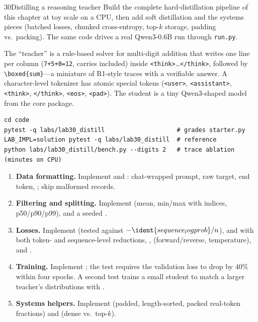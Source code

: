 \begin{labbox}{30}{Distilling a reasoning teacher}
Build the complete hard-distillation pipeline of this chapter at toy scale on a CPU, then add
soft distillation and the systems pieces (batched losses, chunked cross-entropy, top-$k$ storage,
padding vs.\ packing). The same code drives a real Qwen3-0.6B run through \texttt{run.py}.

The ``teacher'' is a rule-based solver for multi-digit addition that writes one line per column
(\texttt{7+5+0=12}, carries included) inside \texttt{<think>}\ldots\texttt{</think>}, followed by
\texttt{\textbackslash boxed\{sum\}}---a miniature of R1-style traces with a verifiable answer. A character-level
tokenizer has atomic special tokens (\texttt{<user>}, \texttt{<assistant>}, \texttt{<think>},
\texttt{</think>}, \texttt{<eos>}, \texttt{<pad>}). The student is a tiny Qwen3-shaped model from
the core package.
\begin{lstlisting}[style=shell]
cd code
pytest -q labs/lab30_distill                    # grades starter.py
LAB_IMPL=solution pytest -q labs/lab30_distill  # reference
python labs/lab30_distill/bench.py --digits 2   # trace ablation (minutes on CPU)
\end{lstlisting}

\begin{enumerate}
\item \textbf{Data formatting.} Implement  and
: chat-wrapped prompt, raw target, end token, ;
skip malformed records.
\item \textbf{Filtering and splitting.} Implement  (mean, min/max with
indices, p50/p90/p99),  and a seeded .
\item \textbf{Losses.} Implement  (tested against
$-\ident{sequence_logprob}/n$),  and 
with both token- and sequence-level reductions, ,
 (forward/reverse, temperature),  and .
\item \textbf{Training.} Implement ; the test requires the validation
loss to drop by 40\% within four epochs. A second test trains a small student to match a larger
teacher's distributions with .
\item \textbf{Systems helpers.} Implement  (padded, length-sorted, packed
real-token fractions) and  (dense vs.\ top-$k$).
\end{enumerate}


\end{labbox}
